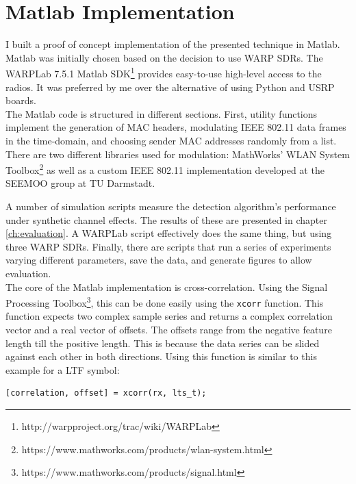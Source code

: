 
\section{Matlab Implementation}\label{sec:matlab-impl}

I built a proof of concept implementation of the presented technique in Matlab. Matlab was initially chosen based on the decision to use \gls{WARP} \glspl{SDR}. The WARPLab 7.5.1 Matlab \gls{SDK}\footnote{http://warpproject.org/trac/wiki/WARPLab} provides easy-to-use high-level access to the radios. It was preferred by me over the alternative of using Python and \gls{USRP} boards.\\

The Matlab code is structured in different sections. First, utility functions implement the generation of \gls{MAC} headers, modulating IEEE 802.11 data frames in the time-domain, and choosing sender \gls{MAC} addresses randomly from a list. There are two different libraries used for modulation: MathWorks' WLAN System Toolbox\footnote{https://www.mathworks.com/products/wlan-system.html} as well as a custom IEEE 802.11 implementation developed at the \gls{SEEMOO} group at TU Darmstadt.

A number of simulation scripts measure the detection algorithm's performance under synthetic channel effects. The results of these are presented in chapter \ref{ch:evaluation}. A WARPLab script effectively does the same thing, but using three \gls{WARP} \glspl{SDR}. Finally, there are scripts that run a series of experiments varying different parameters, save the data, and generate figures to allow evaluation.\\

The core of the Matlab implementation is cross-correlation. Using the Signal Processing Toolbox\footnote{https://www.mathworks.com/products/signal.html}, this can be done easily using the \texttt{xcorr} function. This function expects two complex sample series and returns a complex correlation vector and a real vector of offsets. The offsets range from the negative feature length till the positive length. This is because the data series can be slided against each other in both directions. Using this function is similar to this example for a \gls{LTF} symbol:\\

\begin{lstlisting}[captionpos=b,caption={Cross-Correlation of an LTF Symbol},label=lst:xcorr]
[correlation, offset] = xcorr(rx, lts_t);
\end{lstlisting}

